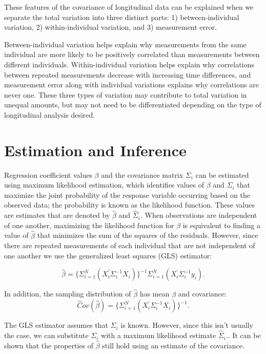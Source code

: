 \documentclass[12pt, twoside]{amherstthesis}
\begin{document}
These features of the covariance of longitudinal data can be explained when we separate the total variation into three distinct parts: 1) between-individual variation, 2) within-individual variation, and 3) measurement error.

Between-individual variation helps explain why measurements from the same individual are more likely to be positively correlated than measurements between different individuals. Within-individual variation helps explain why correlations between repeated measurements decrease with increasing time differences, and measurement error along with individual variations explains why correlations are never one. These three types of variation may contribute to total variation in unequal amounts, but may not need to be differentiated depending on the type of longitudinal analysis desired.

\hypertarget{estimation-and-inference}{%
\section{Estimation and Inference}\label{estimation-and-inference}}

Regression coefficient values \(\beta\) and the covariance matrix \(\Sigma_i\) can be estimated using maximum likelihood estimation, which identifies values of \(\beta\) and \(\Sigma_i\) that maximize the joint probability of the response variable occurring based on the observed data; the probability is known as the likelihood function. These values are estimates that are denoted by \(\hat\beta\) and \(\hat\Sigma_i.\) When observations are independent of one another, maximizing the likelihood function for \(\beta\) is equivalent to finding a value of \(\hat\beta\) that minimizes the sum of the squares of the residuals. However, since there are repeated measurements of each individual that are not independent of one another we use the generalized least squares (GLS) estimator:

\[\hat\beta = \{ \Sigma_{i=1}^N(X_i^{'}\Sigma^{-1}_iX_i) \}^{-1}\Sigma_{i=1}^N(X_i^{'}\Sigma^{-1}_iy_i).\]

In addition, the sampling distribution of \(\hat\beta\) has mean \(\beta\) and covariance:
\[\hat Cov(\hat\beta) = \{ \Sigma_{i=1}^N(X_i^{'}\Sigma^{-1}_iX_i) \}^{-1}.\]

The GLS estimator assumes that \(\Sigma_i\) is known. However, since this isn't usually the case, we can substitute \(\Sigma_i\) with a maximum likelihood estimate \(\hat\Sigma_i.\). It can be shown that the properties of \(\hat\beta\) still hold using an estimate of the covariance.
\end{document}

